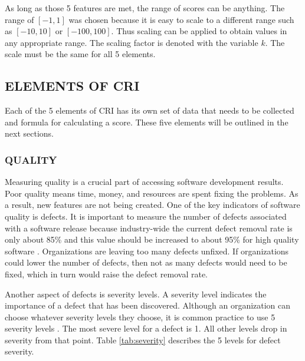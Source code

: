 \documentclass[SDSUThesis.tex]{subfiles}
\begin{document}
    As long as those 5 features are met, the range of scores can be anything.  
    The range of $[-1,1]$ was chosen because it is easy to scale 
    to a different range such as $[-10,10]$ or $[-100,100]$.  
    Thus scaling can be applied to obtain values in any appropriate range. 
    The scaling factor is denoted with the variable $k$.  
    The scale must be the same
    for all 5 elements.
    
    \subsection{ELEMENTS OF CRI}
        Each of the 5 elements of CRI has its own set of data that needs to
        be collected and formula for calculating a score. 
        These five elements will be outlined in the next sections.
        
        \subsubsection{QUALITY}
            Measuring quality is a crucial part of accessing 
            software development results.  
            Poor quality means time, money, and resources are spent 
            fixing the problems. As a result, new features are not being
            created. One of the key indicators of software quality 
            is defects.  It is important
            to measure the number of defects associated with a software 
            release because industry-wide the current defect removal rate is only 
            about 85\% and this value should be increased to 
            about 95\% for high quality software \cite{Jones2009}. 
            Organizations are leaving too many defects unfixed.  If organizations
            could lower the number of defects, then not as many defects would
            need to be fixed, which in turn would raise the defect removal rate.
            
            Another aspect of defects is severity levels.  A severity level indicates
            the importance of a defect that has been discovered.  Although an
            organization can choose whatever severity levels they choose, it is
            common practice to use 5 severity levels \cite{Raynus1999}.  The most 
            severe level for a defect is 1.  All other levels drop in severity 
            from that point. Table \ref{tab:severity} describes the 5 levels
            for defect severity.  
\end{document}
